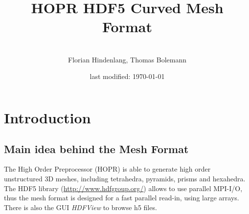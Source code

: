 \documentclass[a4paper,headsepline]{scrreprt}
\renewcommand{\chaptermark}[1]{\markboth{#1}{}}
\renewcommand{\sectionmark}[1]{\markboth{\thesection\ #1}{}}
\begin{document}
\sloppy

\begin{titlepage}

\title{HOPR HDF5 Curved Mesh Format}

\author{\\
          Florian Hindenlang, Thomas Bolemann }


\date{last modified: \today}
\publishers{Institute for Aerodynamics and Gasdynamics, \\
            University of Stuttgart}



\end{titlepage}
\maketitle

\tableofcontents

\pagestyle{plain}
\renewcommand{\chaptermark}[1]{\markboth{#1}{}}
\renewcommand{\sectionmark}[1]{\markboth{\thesection\ #1}{}}
\lhead[\fancyplain{}{\sl\leftmark}]%
      {\fancyplain{}{\sl\leftmark}}
\rhead[\fancyplain{}{\sl\thepage}]%
      {\fancyplain{}{\sl\thepage}}
\cfoot{}




\newpage
\chapter{Introduction}

\section{Main idea behind the Mesh Format}

The High Order Preprocessor (HOPR) is able to generate high order unstructured 3D meshes, including tetrahedra, pyramids, prisms and hexahedra.  The HDF5 library (\url{http://www.hdfgroup.org/}) allows to use parallel MPI-I/O, thus the mesh format is designed for a fast parallel read-in, using large arrays. There is also the GUI \emph{HDFView} to browse h5 files.
\end{document}

